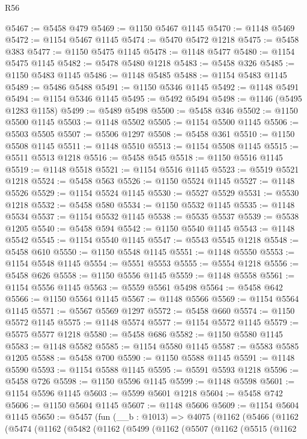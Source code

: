 \begin{lexlean}{R56}
\begin{coremodule}
@5467 := @5458 @479
@5469 := @1150 @5467 @1145
@5470 := @1148 @5469
@5472 := @1154 @5467 @1145
@5474 := @5470 @5472 @1218
@5475 := @5458 @383
@5477 := @1150 @5475 @1145
@5478 := @1148 @5477
@5480 := @1154 @5475 @1145
@5482 := @5478 @5480 @1218
@5483 := @5458 @326
@5485 := @1150 @5483 @1145
@5486 := @1148 @5485
@5488 := @1154 @5483 @1145
@5489 := @5486 @5488
@5491 := @1150 @5346 @1145
@5492 := @1148 @5491
@5494 := @1154 @5346 @1145
@5495 := @5492 @5494
@5498 := @1146 (@5495 @1283 @1158)
@5499 := @5489 @5498
@5500 := @5458 @346
@5502 := @1150 @5500 @1145
@5503 := @1148 @5502
@5505 := @1154 @5500 @1145
@5506 := @5503 @5505
@5507 := @5506 @1297
@5508 := @5458 @361
@5510 := @1150 @5508 @1145
@5511 := @1148 @5510
@5513 := @1154 @5508 @1145
@5515 := @5511 @5513 @1218
@5516 := @5458 @545
@5518 := @1150 @5516 @1145
@5519 := @1148 @5518
@5521 := @1154 @5516 @1145
@5523 := @5519 @5521 @1218
@5524 := @5458 @563
@5526 := @1150 @5524 @1145
@5527 := @1148 @5526
@5529 := @1154 @5524 @1145
@5530 := @5527 @5529
@5531 := @5530 @1218
@5532 := @5458 @580
@5534 := @1150 @5532 @1145
@5535 := @1148 @5534
@5537 := @1154 @5532 @1145
@5538 := @5535 @5537
@5539 := @5538 @1205
@5540 := @5458 @594
@5542 := @1150 @5540 @1145
@5543 := @1148 @5542
@5545 := @1154 @5540 @1145
@5547 := @5543 @5545 @1218
@5548 := @5458 @610
@5550 := @1150 @5548 @1145
@5551 := @1148 @5550
@5553 := @1154 @5548 @1145
@5554 := @5551 @5553
@5555 := @5554 @1218
@5556 := @5458 @626
@5558 := @1150 @5556 @1145
@5559 := @1148 @5558
@5561 := @1154 @5556 @1145
@5563 := @5559 @5561 @5498
@5564 := @5458 @642
@5566 := @1150 @5564 @1145
@5567 := @1148 @5566
@5569 := @1154 @5564 @1145
@5571 := @5567 @5569 @1297
@5572 := @5458 @660
@5574 := @1150 @5572 @1145
@5575 := @1148 @5574
@5577 := @1154 @5572 @1145
@5579 := @5575 @5577 @1218
@5580 := @5458 @686
@5582 := @1150 @5580 @1145
@5583 := @1148 @5582
@5585 := @1154 @5580 @1145
@5587 := @5583 @5585 @1205
@5588 := @5458 @700
@5590 := @1150 @5588 @1145
@5591 := @1148 @5590
@5593 := @1154 @5588 @1145
@5595 := @5591 @5593 @1218
@5596 := @5458 @726
@5598 := @1150 @5596 @1145
@5599 := @1148 @5598
@5601 := @1154 @5596 @1145
@5603 := @5599 @5601 @1218
@5604 := @5458 @742
@5606 := @1150 @5604 @1145
@5607 := @1148 @5606
@5609 := @1154 @5604 @1145
@5650 := @5457
    (fun (__b : @1013) =>
    @4075
      (@1162
        (@5466
          (@1162
            (@5474
              (@1162
                (@5482
                  (@1162
                    (@5499
                      (@1162
                        (@5507
                          (@1162
                            (@5515
                              (@1162

\end{coremodule}
\end{lexlean}
